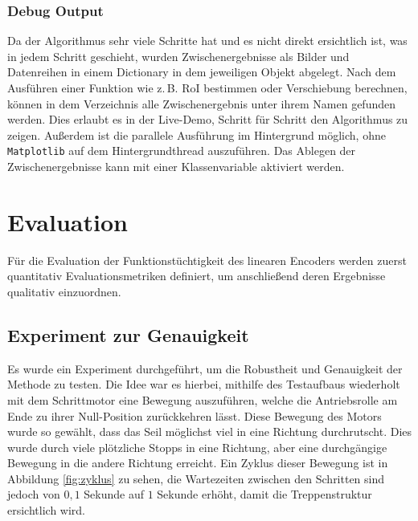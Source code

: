 \documentclass[10pt,a4paper]{scrarticle}
\begin{document}
\subsubsection{Debug Output}
Da der Algorithmus sehr viele Schritte hat und es nicht direkt ersichtlich ist, was in jedem Schritt geschieht, wurden Zwischenergebnisse als Bilder und Datenreihen in einem Dictionary in dem jeweiligen Objekt abgelegt. Nach dem Ausführen einer Funktion wie z.\,B. RoI bestimmen oder Verschiebung berechnen, können in dem Verzeichnis alle Zwischenergebnis unter ihrem Namen gefunden werden. Dies erlaubt es in der Live-Demo, Schritt für Schritt den Algorithmus zu zeigen. Außerdem ist die parallele Ausführung im Hintergrund möglich, ohne \texttt{Matplotlib} auf dem Hintergrundthread auszuführen. Das Ablegen der Zwischenergebnisse kann mit einer Klassenvariable aktiviert werden.

\section{Evaluation}
Für die Evaluation der Funktionstüchtigkeit des linearen Encoders werden zuerst quantitativ Evaluationsmetriken definiert, um anschließend deren Ergebnisse qualitativ einzuordnen. 


\subsection{Experiment zur Genauigkeit}
Es wurde ein Experiment durchgeführt, um die Robustheit und Genauigkeit der Methode zu testen. Die Idee war es hierbei, mithilfe des Testaufbaus wiederholt mit dem Schrittmotor eine Bewegung auszuführen, welche die Antriebsrolle am Ende zu ihrer Null-Position zurückkehren lässt. Diese Bewegung des Motors wurde so gewählt, dass das Seil möglichst viel in eine Richtung durchrutscht. Dies wurde durch viele plötzliche Stopps in eine Richtung, aber eine durchgängige Bewegung in die andere Richtung erreicht. Ein Zyklus dieser Bewegung ist in Abbildung \ref{fig:zyklus} zu sehen, die Wartezeiten zwischen den Schritten sind jedoch von $0,1$ Sekunde auf $1$ Sekunde erhöht, damit die Treppenstruktur ersichtlich wird.
\end{document}
